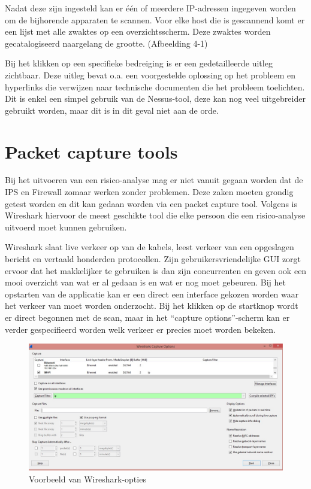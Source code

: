 \documentclass[pdftex,a4paper,12pt]{report}
\begin{document}
Nadat deze zijn ingesteld kan er één of meerdere IP-adressen ingegeven worden om de bijhorende apparaten te scannen. Voor elke host die is gescannend komt er een lijst met alle zwaktes op een overzichtsscherm. Deze zwaktes worden gecatalogiseerd naargelang de grootte. (Afbeelding 4-1) \newline

Bij het klikken op een specifieke bedreiging is er een gedetailleerde uitleg zichtbaar. Deze uitleg bevat o.a. een voorgestelde oplossing op het probleem en hyperlinks die verwijzen naar technische documenten die het probleem toelichten. Dit is enkel een simpel gebruik van de Nessus-tool, deze kan nog veel uitgebreider gebruikt worden, maar dit is in dit geval niet aan de orde. \citep{Jackson2010}

\section{Packet capture tools}
Bij het uitvoeren van een risico-analyse mag er niet vanuit gegaan worden dat de IPS en Firewall zomaar werken zonder problemen. Deze zaken moeten grondig getest worden en dit kan gedaan worden via een packet capture tool. Volgens \cite{Jackson2010} is Wireshark hiervoor de meest geschikte tool die elke persoon die een risico-analyse uitvoerd moet kunnen gebruiken. \newline

Wireshark slaat live verkeer op van de kabels, leest verkeer van een opgeslagen bericht en vertaald honderden protocollen. Zijn gebruikersvriendelijke GUI zorgt ervoor dat het makkelijker te gebruiken is dan zijn concurrenten en geven ook een mooi overzicht van wat er al gedaan is en wat er nog moet gebeuren. Bij het opstarten van de applicatie kan er een direct een interface gekozen worden waar het verkeer van moet worden onderzocht. Bij het klikken op de startknop wordt er direct begonnen met de scan, maar in het "`capture options"'-scherm kan er verder gespecifieerd worden welk verkeer er precies moet worden bekeken.

\begin{figure}[H]
\begin{center}
\includegraphics[scale=0.50]{img/Wireshark1}
\end{center}
\caption{Voorbeeld van Wireshark-opties}
\end{figure}
\end{document}
